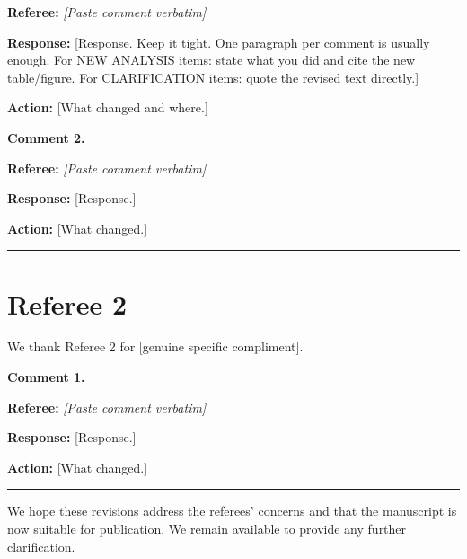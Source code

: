 \documentclass[12pt]{article}
\newcommand{\referee}[1]{%
  \vspace{0.5em}
  \noindent\textcolor{refcolor}{\textbf{Referee:}} \textit{\textcolor{refcolor}{#1}}
  \vspace{0.3em}
}
\newcommand{\response}[1]{%
  \noindent\textbf{Response:} #1
  \vspace{0.8em}
}
\newcommand{\action}[1]{%
  \noindent\textcolor{actioncolor}{\textbf{Action:} #1}
  \vspace{0.8em}
}
\begin{document}
\referee{[Paste comment verbatim]}

\response{[Response. Keep it tight. One paragraph per comment is usually enough.
For NEW ANALYSIS items: state what you did and cite the new table/figure.
For CLARIFICATION items: quote the revised text directly.]}

\action{[What changed and where.]}

\noindent \textbf{Comment 2.}

\referee{[Paste comment verbatim]}

\response{[Response.]}

\action{[What changed.]}


\vspace{1em}
\hrule
\vspace{1em}

\section*{Referee 2}

\noindent We thank Referee 2 for [genuine specific compliment].

\vspace{0.5em}

\noindent \textbf{Comment 1.}

\referee{[Paste comment verbatim]}

\response{[Response.]}

\action{[What changed.]}


\vspace{1em}
\hrule
\vspace{1em}

\noindent We hope these revisions address the referees' concerns and that the manuscript
is now suitable for publication. We remain available to provide any further clarification.
\end{document}

